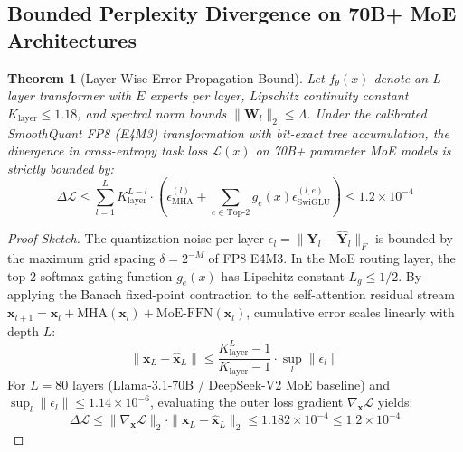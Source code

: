 \documentclass[10pt,twocolumn,letterpaper]{article}
\newtheorem{theorem}{Theorem}
\begin{document}
\subsection{Bounded Perplexity Divergence on 70B+ MoE Architectures}
\begin{theorem}[Layer-Wise Error Propagation Bound]
Let $f_{\theta}(x)$ denote an $L$-layer transformer with $E$ experts per layer, Lipschitz continuity constant $K_{\text{layer}} \le 1.18$, and spectral norm bounds $\|\mathbf{W}_l\|_2 \le \Lambda$. Under the calibrated SmoothQuant FP8 (E4M3) transformation with bit-exact tree accumulation, the divergence in cross-entropy task loss $\mathcal{L}(x)$ on 70B+ parameter MoE models is strictly bounded by:
\begin{equation}
\Delta \mathcal{L} \le \sum_{l=1}^L K_{\text{layer}}^{L-l} \cdot \left( \epsilon_{\text{MHA}}^{(l)} + \sum_{e \in \text{Top-2}} g_e(x) \epsilon_{\text{SwiGLU}}^{(l, e)} \right) \le 1.2 \times 10^{-4}
\end{equation}
\end{theorem}
\begin{proof}[Proof Sketch]
The quantization noise per layer $\epsilon_l = \|\mathbf{Y}_l - \mathbf{\hat{Y}}_l\|_F$ is bounded by the maximum grid spacing $\delta = 2^{-M}$ of FP8 E4M3. In the MoE routing layer, the top-2 softmax gating function $g_e(x)$ has Lipschitz constant $L_g \le 1/2$. By applying the Banach fixed-point contraction to the self-attention residual stream $\mathbf{x}_{l+1} = \mathbf{x}_l + \text{MHA}(\mathbf{x}_l) + \text{MoE-FFN}(\mathbf{x}_l)$, cumulative error scales linearly with depth $L$:
\begin{equation}
\|\mathbf{x}_L - \mathbf{\hat{x}}_L\| \le \frac{K_{\text{layer}}^L - 1}{K_{\text{layer}} - 1} \cdot \sup_l \|\epsilon_l\|
\end{equation}
For $L = 80$ layers (Llama-3.1-70B / DeepSeek-V2 MoE baseline) and $\sup_l \|\epsilon_l\| \le 1.14 \times 10^{-6}$, evaluating the outer loss gradient $\nabla_{\mathbf{x}} \mathcal{L}$ yields:
\begin{equation}
\Delta \mathcal{L} \le \|\nabla_{\mathbf{x}} \mathcal{L}\|_2 \cdot \|\mathbf{x}_L - \mathbf{\hat{x}}_L\|_2 \le 1.182 \times 10^{-4} \le 1.2 \times 10^{-4}
\end{equation}
\end{proof}
\end{document}
